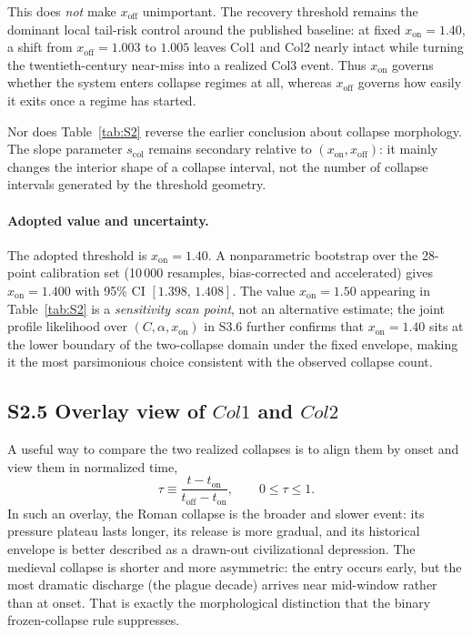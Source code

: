 \documentclass[11pt]{article}
\newcommand{\xon}{x_{\mathrm{on}}}
\newcommand{\xoff}{x_{\mathrm{off}}}
\newcommand{\ColOne}{Col1}
\newcommand{\ColTwo}{Col2}
\newcommand{\ColThree}{Col3}
\begin{document}
This does \emph{not} make $\xoff$ unimportant. The recovery threshold remains the dominant local tail-risk control around the published baseline: at fixed $\xon=1.40$, a shift from $\xoff=1.003$ to $1.005$ leaves \ColOne{} and \ColTwo{} nearly intact while turning the twentieth-century near-miss into a realized \ColThree{} event. Thus $\xon$ governs whether the system enters collapse regimes at all, whereas $\xoff$ governs how easily it exits once a regime has started.

Nor does Table~\ref{tab:S2} reverse the earlier conclusion about collapse morphology. The slope parameter $s_{\mathrm{col}}$ remains secondary relative to $(\xon,\xoff)$: it mainly changes the interior shape of a collapse interval, not the number of collapse intervals generated by the threshold geometry.

\paragraph{Adopted value and uncertainty.}
The adopted threshold is $\xon=1.40$.  A nonparametric bootstrap
over the 28-point calibration set (10\,000 resamples, bias-corrected
and accelerated) gives $\xon=1.400$ with 95\% CI $[1.398,\,1.408]$.
The value $\xon=1.50$ appearing in Table~\ref{tab:S2} is a
\emph{sensitivity scan point}, not an alternative estimate; the joint
profile likelihood over $(C,\alpha,\xon)$ in S3.6 further confirms
that $\xon=1.40$ sits at the lower boundary of the two-collapse
domain under the fixed envelope, making it the most parsimonious
choice consistent with the observed collapse count.

\subsection*{S2.5 Overlay view of \texorpdfstring{$\ColOne$}{Col1} and \texorpdfstring{$\ColTwo$}{Col2}}

A useful way to compare the two realized collapses is to align them by onset and view them in normalized time,
\begin{equation}
\tau \equiv \frac{t-t_{\mathrm{on}}}{t_{\mathrm{off}}-t_{\mathrm{on}}},\qquad0\le \tau \le 1.
\end{equation}
In such an overlay, the Roman collapse is the broader and slower event: its pressure plateau lasts longer, its release is more gradual, and its historical envelope is better described as a drawn-out civilizational depression. The medieval collapse is shorter and more asymmetric: the entry occurs early, but the most dramatic discharge (the plague decade) arrives near mid-window rather than at onset. That is exactly the morphological distinction that the binary frozen-collapse rule suppresses.
\end{document}
